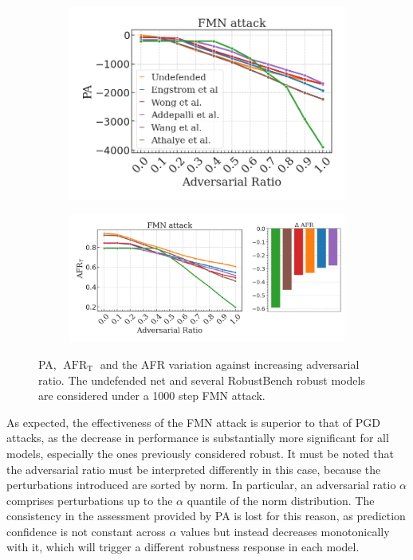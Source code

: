 \begin{figure}[H]
    \centering
    \begin{subfigure}[b]{0.39\textwidth}
        \centering
        \includegraphics[width=\textwidth]{img/results_discussion/adversarial/FMN_logPA.png}
    \end{subfigure}
    \hfill
    \begin{subfigure}[b]{0.59\textwidth}
        \centering
        \includegraphics[width=\textwidth]{img/results_discussion/adversarial/FMN_1000_AFR_true.png}
    \end{subfigure}
    \caption{PA, $\operatorname{AFR}_\text{T}$ and the AFR variation against increasing adversarial ratio. 
    The undefended net and several RobustBench robust models are considered 
    under a 1000 step FMN attack.}
    \label{fig:adv_fmn_pa_afr}
\end{figure}


As expected, the effectiveness of the FMN attack is superior to that of PGD attacks, as
the decrease in performance is substantially more significant for all models, especially the ones
previously considered robust. It must be noted that the adversarial ratio must be interpreted differently
in this case, because the perturbations introduced are sorted by norm. 
In  particular, an adversarial ratio $\alpha$ comprises perturbations up to the $\alpha$ quantile
of the norm distribution. The consistency in the assessment provided by PA is lost for this 
reason, as prediction confidence is not constant across $\alpha$ values but instead decreases
monotonically with it, which will trigger a different robustness response in each model. \\

